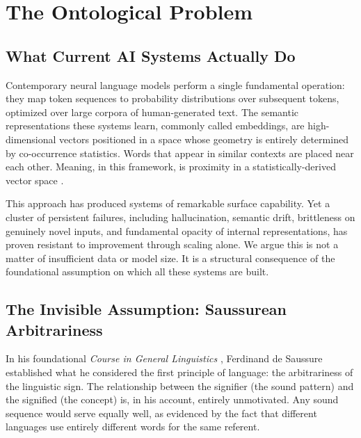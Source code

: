 \documentclass[12pt]{article}
\begin{document}
\begin{abstract}
\smallskip
\noindent\textbf{Keywords:} phonosemantics, semantic grounding, Sanskrit, Panini, interpretable AI, source-filter theory, motor theory of speech, embodied cognition, articulation, NLP foundations
\end{abstract}

\vspace{1em}

\section{The Ontological Problem}

\subsection{What Current AI Systems Actually Do}

Contemporary neural language models perform a single fundamental operation: they map token sequences to probability distributions over subsequent tokens, optimized over large corpora of human-generated text. The semantic representations these systems learn, commonly called embeddings, are high-dimensional vectors positioned in a space whose geometry is entirely determined by co-occurrence statistics. Words that appear in similar contexts are placed near each other. Meaning, in this framework, is proximity in a statistically-derived vector space \citep{mikolov2013, pennington2014, devlin2019}.

This approach has produced systems of remarkable surface capability. Yet a cluster of persistent failures, including hallucination, semantic drift, brittleness on genuinely novel inputs, and fundamental opacity of internal representations, has proven resistant to improvement through scaling alone. We argue this is not a matter of insufficient data or model size. It is a structural consequence of the foundational assumption on which all these systems are built.

\subsection{The Invisible Assumption: Saussurean Arbitrariness}

In his foundational \textit{Course in General Linguistics} \citep{saussure1916}, Ferdinand de Saussure established what he considered the first principle of language: the arbitrariness of the linguistic sign. The relationship between the signifier (the sound pattern) and the signified (the concept) is, in his account, entirely unmotivated. Any sound sequence would serve equally well, as evidenced by the fact that different languages use entirely different words for the same referent.
\end{document}
